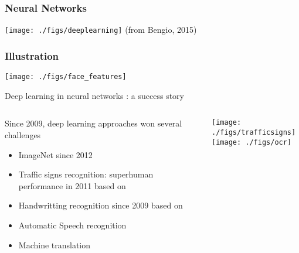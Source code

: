 \begin{frame}
  \frametitle{Neural Networks}
  \begin{center}
    \texttt{[image: ./figs/deeplearning]}
    \scriptsize{(from Bengio, 2015)}
  \end{center}
\end{frame}



\begin{frame}
  \frametitle{Illustration}
  \begin{center}
    \texttt{[image: ./figs/face\_features]}
  \end{center}
  \begin{flushright}
    \cite{Lee09convDBN}
  \end{flushright}
\end{frame}



\begin{frame}{Deep learning in neural networks : a  success story}
  \begin{columns}
    \begin{block}{Since 2009, deep learning approaches won several challenges}
    \begin{itemize}
    \item ImageNet since 2012 \cite{Krizhevsky12ImageNet} 
    \item Traffic signs recognition: superhuman performance in 2011 \cite{Ciresan12Multicolumn} based on \cite{LeCun89}
    \item Handwritting recognition since 2009 \cite{Graves09Offline} based on \cite{Hochreiter97LSTM}
    \item Automatic Speech recognition \cite{Hinton12ASR}
    \item Machine translation \cite{Vaswani17Attention}
    \end{itemize}
  \end{block}
  \begin{center} 
      \texttt{[image: ./figs/trafficsigns]}\\
     \texttt{[image: ./figs/ocr]}
  \end{center}
\end{columns}
\end{frame}




